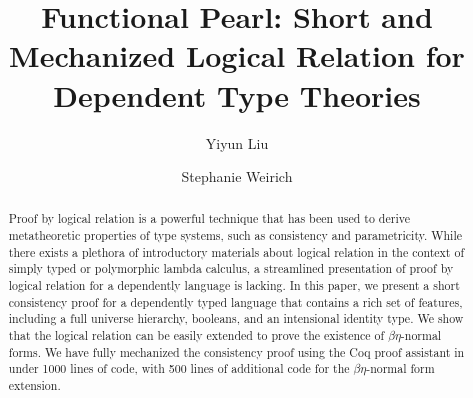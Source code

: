 \documentclass[acmsmall,screen=true,
\ifpublic review=false\else,review=true\fi
  ,anonymous=\ifanonymous true\else false\fi]{acmart}
\begin{document}
\title{Functional Pearl: Short and Mechanized Logical Relation for Dependent Type Theories}

\author{Yiyun Liu}

\author{Stephanie Weirich}


\begin{abstract}
Proof by logical relation is a powerful technique that has been used
to derive metatheoretic properties of type systems, such as
consistency and parametricity. While there exists a
plethora of introductory materials about logical relation in the
context of simply typed or polymorphic lambda calculus, a streamlined
presentation of proof by logical relation for a dependently language
is lacking. In this paper, we present a short
consistency proof for a dependently typed language that contains a
rich set of features, including a full universe
hierarchy, booleans, and an intensional identity type. We show that
the logical relation can be easily extended to prove the existence of
$\beta\eta$-normal forms.
We have
fully mechanized the consistency proof using the Coq proof assistant
in under 1000 lines of code, with 500 lines of additional code for the
$\beta\eta$-normal form extension.
\end{abstract}

\end{document}
